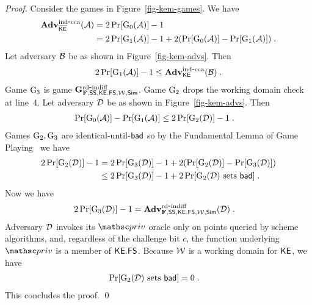 \begin{proof} Consider the games in Figure~\ref{fig-kem-games}. We have
\begin{align*}
	\mathbf{Adv}^{\mathrm{ind\mbox{-}cca}}_{\overline{\mathsf{KE}}}(\mathcal{A}) &= 2\Pr[\textnormal{G}_0(\mathcal{A})]-1 \\
	&= 2\Pr[\textnormal{G}_1(\mathcal{A})]-1 + 2(\Pr[\textnormal{G}_0(\mathcal{A})]-\Pr[\textnormal{G}_1(\mathcal{A})]) \;.
\end{align*}
Let adversary $\mathcal{B}$ be as shown in Figure~\ref{fig-kem-advs}. Then
\begin{align*}
 2\Pr[\textnormal{G}_1(\mathcal{A})]-1 \leq \mathbf{Adv}^{\mathrm{ind\mbox{-}cca}}_{{\mathsf{KE}}}(\mathcal{B}) \;.
\end{align*}
Game $\textnormal{G}_3$ is game $\mathbf{G}^{\mathrm{rd\mbox{-}indiff}}_{\mathbf{F},\mathsf{SS},\mathsf{{\mathsf{KE}}.FS},{\cal W},\mathsf{Sim}}$. Game $\textnormal{G}_2$ drops the working domain check at line~4. Let adversary $\mathcal{D}$ be as shown in Figure~\ref{fig-kem-advs}. Then
\begin{align*}
	\Pr[\textnormal{G}_0(\mathcal{A})]-\Pr[\textnormal{G}_1(\mathcal{A})] &\leq 2\Pr[\textnormal{G}_2(\mathcal{D})]-1 \;.
\end{align*}
Games $\textnormal{G}_2,\textnormal{G}_3$ are identical-until-$\mathsf{bad}$ so by the Fundamental Lemma of Game Playing~\cite{EC:BelRog06} we have
\begin{align*}
	2\Pr[\textnormal{G}_2(\mathcal{D})]-1 &= 2\Pr[\textnormal{G}_3(\mathcal{D})]-1 + 
	2(\Pr[\textnormal{G}_2(\mathcal{D})]-\Pr[\textnormal{G}_3(\mathcal{D})]) \\
	&\leq 2\Pr[\textnormal{G}_3(\mathcal{D})]-1 + 2\Pr[\textnormal{G}_2(\mathcal{D})\mbox{ sets }\mathsf{bad}] \;.
\end{align*}
Now we have
\begin{align*}
	2\Pr[\textnormal{G}_3(\mathcal{D})]-1 &= \mathbf{Adv}^{\mathrm{rd\mbox{-}indiff}}_{\mathbf{F},\mathsf{SS},\mathsf{{\mathsf{KE}}.FS},{\cal W},\mathsf{Sim}}(\mathcal{D})  \;.
\end{align*}
Adversary $\mathcal{D}$ invokes its $\priv$ oracle only on points queried by scheme algorithms, and, regardless of the challenge bit $c$, the function underlying $\priv$ is a member of $\mathsf{{\mathsf{KE}}.FS}$. Because ${\cal W}$ is a working domain for ${\mathsf{KE}}$, we have
\begin{align*}
	\Pr[\textnormal{G}_2(\mathcal{D})\mbox{ sets }\mathsf{bad}] &=0  \;.
\end{align*}
This concludes the proof. \qed
\end{proof}
%
%
